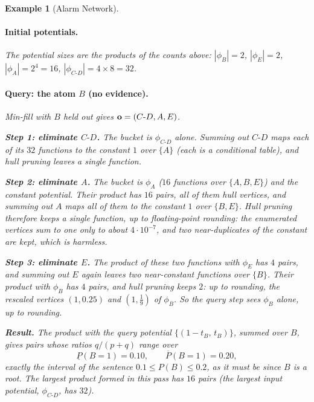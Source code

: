 \documentclass{article} %
\newtheorem{example}{Example}
\begin{document}
\begin{example}[Alarm Network]
\paragraph{Initial potentials.}
The potential sizes are the \emph{products} of the counts above:
$|\phi_B| = 2$, $|\phi_E| = 2$, $|\phi_A| = 2^4 = 16$,
$|\phi_{C\text{-}D}| = 4 \times 8 = 32$.

\paragraph{Query: the atom $B$ (no evidence).}
Min-fill with $B$ held out gives $\mathbf{o}=(C\text{-}D, A, E)$.

\textbf{Step 1: eliminate $C\text{-}D$.} The bucket is $\phi_{C\text{-}D}$ alone.
Summing out $C\text{-}D$ maps each of its $32$ functions to the constant $1$ over
$\{A\}$ (each is a conditional table), and hull pruning leaves a single function.

\textbf{Step 2: eliminate $A$.} The bucket is $\phi_A$ ($16$ functions over
$\{A,B,E\}$) and the constant potential. Their product has $16$ pairs, all of them
hull vertices, and summing out $A$ maps all of them to the constant $1$ over $\{B,E\}$.
Hull pruning therefore keeps a single function, up to floating-point rounding: the
enumerated vertices sum to one only to about $4\cdot10^{-7}$, and two near-duplicates
of the constant are kept, which is harmless.

\textbf{Step 3: eliminate $E$.} The product of these two functions with $\phi_E$ has
$4$ pairs, and summing out $E$ again leaves two near-constant functions over $\{B\}$.
Their product with $\phi_B$ has $4$ pairs, and hull pruning keeps $2$: up to rounding,
the rescaled vertices $(1,0.25)$ and $(1,\tfrac19)$ of $\phi_B$. So the query step sees
$\phi_B$ alone, up to rounding.

\textbf{Result.} The product with the query potential $\{(1-t_B,\,t_B)\}$, summed over
$B$, gives pairs whose ratios $q/(p+q)$ range over
\[
  \underline{P}(B{=}1) = 0.10, \qquad \overline{P}(B{=}1) = 0.20 ,
\]
exactly the interval of the sentence $0.1 \le P(B) \le 0.2$, as it must be since $B$
is a root. The largest product formed in this pass has $16$ pairs (the largest
input potential, $\phi_{C\text{-}D}$, has $32$).


\end{example}
\end{document}
